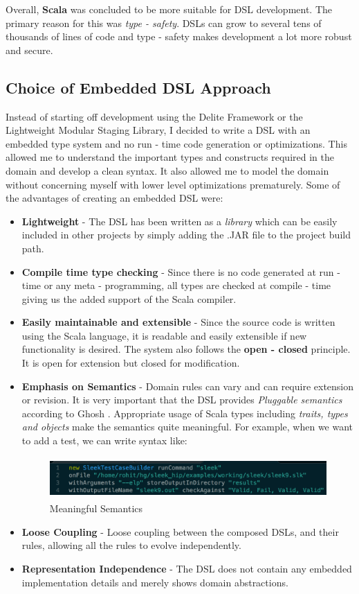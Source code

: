 \noindent
Overall, \textbf{Scala} was concluded to be more suitable for DSL development. The primary reason for this was \textit{type - safety}. DSLs can grow to several tens of thousands of lines of code and type - safety makes development a lot more robust and secure.

\subsection{Choice of Embedded DSL Approach}
Instead of starting off development using the Delite Framework or the Lightweight Modular Staging Library, I decided to write a DSL with an embedded type system and no run - time code generation or optimizations. This allowed me to understand the important types and constructs required in the domain and develop a clean syntax. It also allowed me to model the domain without concerning myself with lower level optimizations prematurely. Some of the advantages of creating an embedded DSL were:
\begin{itemize}
\item \textbf{Lightweight} - The DSL has been written as a \textit{library} which can be easily included in other projects by simply adding the .JAR file to the project build path.
\item \textbf{Compile time type checking} - Since there is no code generated at run - time or any meta - programming, all types are checked at compile - time giving us the added support of the Scala compiler.
\item \textbf{Easily maintainable and extensible} - Since the source code is written using the Scala language, it is readable and easily extensible if new functionality is desired. The system also follows the \textbf{open - closed} principle. It is open for extension but closed for modification.
\item \textbf{Emphasis on Semantics} - Domain rules can vary and can require extension or revision. It is very important that the DSL provides \textit{Pluggable semantics} according to Ghosh \cite{dslsInAction}. Appropriate usage of Scala types including \textit{traits, types and objects} make the semantics quite meaningful. For example, when we want to add a test, we can write syntax like:

\begin{figure}[H]
  \centering
    \includegraphics[height=60px]{figures/declarative_syntax.png}
  \caption{Meaningful Semantics}
\end{figure}

\item \textbf{Loose Coupling} - Loose coupling between the composed DSLs, and their rules, allowing all the rules to evolve independently.
\item \textbf{Representation Independence} - The DSL does not contain any embedded implementation details and merely shows domain abstractions.
\end{itemize}

